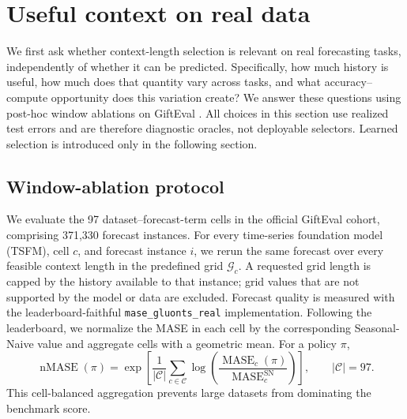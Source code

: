 
\section{Useful context on real data}
\label{sec:real-context}

We first ask whether context-length selection is relevant on real forecasting
tasks, independently of whether it can be predicted.  Specifically, how much
history is useful, how much does that quantity vary across tasks, and what
accuracy--compute opportunity does this variation create?  We answer these
questions using post-hoc window ablations on GiftEval
\cite{auer2024gifteval}.  All choices in this section use realized test errors
and are therefore diagnostic oracles, not deployable selectors.  Learned
selection is introduced only in the following section.

\subsection{Window-ablation protocol}
\label{sec:real-protocol}

We evaluate the 97 dataset--forecast-term cells in the official GiftEval
cohort, comprising 371{,}330 forecast instances.  For every time-series
foundation model (TSFM), cell $c$, and forecast instance $i$, we rerun the same
forecast over every feasible context length in the predefined grid
$\mathcal{G}_c$.  A requested grid length is capped by the history available to
that instance; grid values that are not supported by the model or data are
excluded.  Forecast quality is measured with the leaderboard-faithful
\texttt{mase\_gluonts\_real} implementation.  Following the leaderboard, we
normalize the MASE in each cell by the corresponding Seasonal-Naive value and
aggregate cells with a geometric mean.  For a policy $\pi$,
\begin{equation}
    \operatorname{nMASE}(\pi)
    = \exp\!\left[
        \frac{1}{|\mathcal{C}|}
        \sum_{c\in\mathcal{C}}
        \log\!\left(
            \frac{\operatorname{MASE}_c(\pi)}
                 {\operatorname{MASE}^{\mathrm{SN}}_c}
        \right)
      \right],
    \qquad |\mathcal{C}|=97.
    \label{eq:normalized-mase}
\end{equation}
This cell-balanced aggregation prevents large datasets from dominating the
benchmark score.

